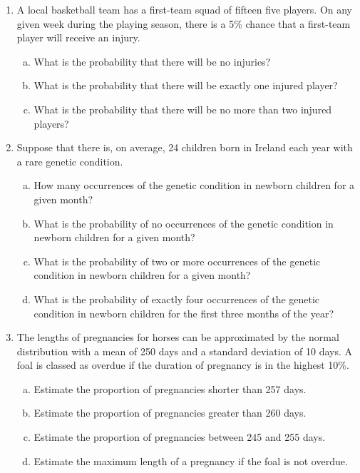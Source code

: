 \documentclass[a4paper,12pt]{article}
\begin{document}
\begin{enumerate}
\item A local basketball team has a first-team squad of fifteen five players.
On any given week during the playing season, there is a 5\% chance that a first-team player will receive an injury.
\begin{enumerate}[(a)]
\item What is the probability that there will be no injuries?
\item What is the probability that there will be exactly one injured player?
\item What is the probability that there will be no more than two injured players?
\end{enumerate}
 
\item Suppose that there is, on average, 24 children born in Ireland each year with a rare genetic condition.

\begin{enumerate}[(a)]
\item How many occurrences of the genetic condition in newborn children for a given month?
\item What is the probability of no occurrences of the genetic condition in newborn children for a given month?

\item What is the probability of two or more occurrences of the genetic condition in newborn children for a given month?
\item What is the probability of exactly four occurrences of the genetic condition in newborn children for the first three months of the year?
\end{enumerate}
\item The lengths of pregnancies for horses can be approximated by the normal distribution with a mean of 250 days and a standard deviation of 10 days. A foal is classed as overdue if the duration of pregnancy is in the highest 10\%. 

\begin{enumerate}[(a)]
\item Estimate the proportion of pregnancies shorter than 257 days.
\item Estimate the proportion of pregnancies greater than 260 days.
\item Estimate the proportion of pregnancies between 245 and 255 days.
\item Estimate the maximum length of a pregnancy if the foal is not overdue. 
\end{enumerate}


\end{enumerate}
\end{document}
